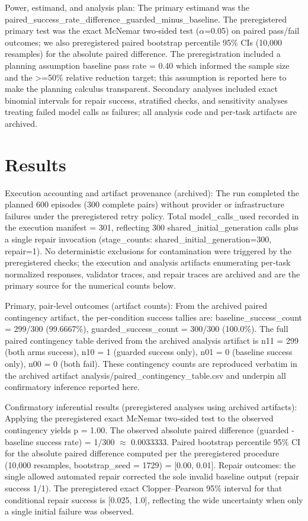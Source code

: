 \documentclass[conference]{IEEEtran}
\begin{document}
Power, estimand, and analysis plan: The primary estimand was the paired\_success\_rate\_difference\_guarded\_minus\_baseline. The preregistered primary test was the exact McNemar two‑sided test (\ensuremath{\alpha}=0.05) on paired pass/fail outcomes; we also preregistered paired bootstrap percentile 95\% CIs (10,000 resamples) for the absolute paired difference. The preregistration included a planning assumption baseline pass rate = 0.40 which informed the sample size and the >=50\% relative reduction target; this assumption is reported here to make the planning calculus transparent. Secondary analyses included exact binomial intervals for repair success, stratified checks, and sensitivity analyses treating failed model calls as failures; all analysis code and per‑task artifacts are archived.

\section{Results}
Execution accounting and artifact provenance (archived): The run completed the planned 600 episodes (300 complete pairs) without provider or infrastructure failures under the preregistered retry policy. Total model\_calls\_used recorded in the execution manifest = 301, reflecting 300 shared\_initial\_generation calls plus a single repair invocation (stage\_counts: shared\_initial\_generation=300, repair=1). No deterministic exclusions for contamination were triggered by the preregistered checks; the execution and analysis artifacts enumerating per‑task normalized responses, validator traces, and repair traces are archived and are the primary source for the numerical counts below.

Primary, pair‑level outcomes (artifact counts): From the archived paired contingency artifact, the per‑condition success tallies are: baseline\_success\_count = 299/300 (99.6667\%), guarded\_success\_count = 300/300 (100.0\%). The full paired contingency table derived from the archived analysis artifact is n11 = 299 (both arms success), n10 = 1 (guarded success only), n01 = 0 (baseline success only), n00 = 0 (both fail). These contingency counts are reproduced verbatim in the archived artifact analysis/paired\_contingency\_table.csv and underpin all confirmatory inference reported here.

Confirmatory inferential results (preregistered analyses using archived artifacts): Applying the preregistered exact McNemar two‑sided test to the observed contingency yields p = 1.00. The observed absolute paired difference (guarded - baseline success rate) = 1/300 \ensuremath{\approx} 0.0033333. Paired bootstrap percentile 95\% CI for the absolute paired difference computed per the preregistered procedure (10,000 resamples, bootstrap\_seed = 1729) = [0.00, 0.01]. Repair outcomes: the single allowed automated repair corrected the sole invalid baseline output (repair success 1/1). The preregistered exact Clopper--Pearson 95\% interval for that conditional repair success is [0.025, 1.0], reflecting the wide uncertainty when only a single initial failure was observed.
\end{document}

